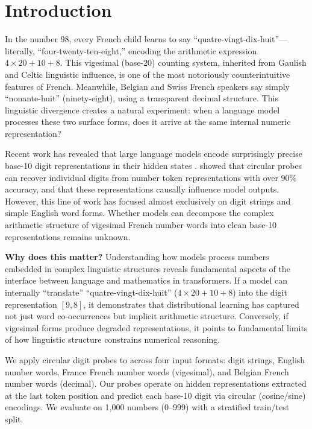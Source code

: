 \section{Introduction}
\label{sec:introduction}

In the number 98, every French child learns to say ``quatre-vingt-dix-huit''---literally, ``four-twenty-ten-eight,'' encoding the arithmetic expression $4\times20+10+8$. This vigesimal (base-20) counting system, inherited from Gaulish and Celtic linguistic influence, is one of the most notoriously counterintuitive features of French. Meanwhile, Belgian and Swiss French speakers say simply ``nonante-huit'' (ninety-eight), using a transparent decimal structure. This linguistic divergence creates a natural experiment: when a language model processes these two surface forms, does it arrive at the same internal numeric representation?

Recent work has revealed that large language models encode surprisingly precise base-10 digit representations in their hidden states \citep{levy2024language, kadlcik2025pretrained}. \citet{levy2024language} showed that circular probes can recover individual digits from number token representations with over 90\% accuracy, and that these representations causally influence model outputs. However, this line of work has focused almost exclusively on digit strings and simple English word forms. Whether models can decompose the complex arithmetic structure of vigesimal French number words into clean base-10 representations remains unknown.

{\bf Why does this matter?} Understanding how models process numbers embedded in complex linguistic structures reveals fundamental aspects of the interface between language and mathematics in transformers. If a model can internally ``translate'' ``quatre-vingt-dix-huit'' ($4\times20+10+8$) into the digit representation $[9, 8]$, it demonstrates that distributional learning has captured not just word co-occurrences but implicit arithmetic structure. Conversely, if vigesimal forms produce degraded representations, it points to fundamental limits of how linguistic structure constrains numerical reasoning.

We apply circular digit probes \citep{levy2024language} to \mistral across four input formats: digit strings, English number words, France French number words (vigesimal), and Belgian French number words (decimal). Our probes operate on hidden representations extracted at the last token position and predict each base-10 digit via circular (cosine/sine) encodings. We evaluate on 1,000 numbers (0--999) with a stratified train/test split.

